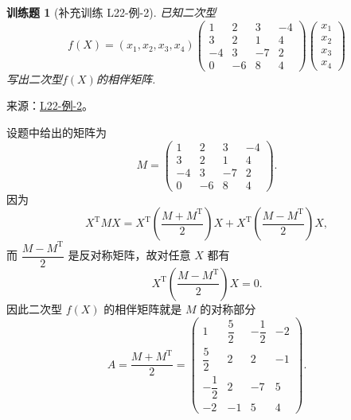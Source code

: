 \documentclass[12pt,fontset=fandol]{ctexart}
\newtheorem{exercise}{训练题}[section]
\begin{document}
\begin{exercise}[补充训练 L22-例-2]\label{prob:L22-例-2}
已知二次型
    \[f(X)=(x_1,x_2,x_3,x_4)\begin{pmatrix}
            1 & 2 & 3 & -4 \\ 3 & 2 & 1 & 4 \\ -4 & 3 & -7 & 2 \\ 0 & -6 & 8 & 4
        \end{pmatrix}\begin{pmatrix}
            x_1 \\ x_2 \\ x_3 \\ x_4
        \end{pmatrix}\]
    写出二次型$f(X)$的相伴矩阵.
\end{exercise}
\noindent 来源：\href{https://github.com/yhwu-is/Linear-Algebra-Left-Undone/blob/new/%E8%AE%B2%E4%B9%89/%E4%B8%93%E9%A2%98/22%20%E4%BA%8C%E6%AC%A1%E5%9E%8B.tex}{L22-例-2}。
\begin{solve}
设题中给出的矩阵为
    \[
        M=\begin{pmatrix}
            1 & 2 & 3 & -4 \\
            3 & 2 & 1 & 4 \\
            -4 & 3 & -7 & 2 \\
            0 & -6 & 8 & 4
        \end{pmatrix}.
    \]
    因为
    \[
        X^\mathrm{T}MX=X^\mathrm{T}\left(\frac{M+M^\mathrm{T}}{2}\right)X+X^\mathrm{T}\left(\frac{M-M^\mathrm{T}}{2}\right)X,
    \]
    而 $ \dfrac{M-M^\mathrm{T}}{2} $ 是反对称矩阵，故对任意 $X$ 都有
    \[
        X^\mathrm{T}\left(\frac{M-M^\mathrm{T}}{2}\right)X=0.
    \]
    因此二次型 $f(X)$ 的相伴矩阵就是 $M$ 的对称部分
    \[
        A=\frac{M+M^\mathrm{T}}{2}
        =\begin{pmatrix}
            1 & \dfrac{5}{2} & -\dfrac{1}{2} & -2 \\
            \dfrac{5}{2} & 2 & 2 & -1 \\
            -\dfrac{1}{2} & 2 & -7 & 5 \\
            -2 & -1 & 5 & 4
        \end{pmatrix}.
    \]
\end{solve}
\end{document}
